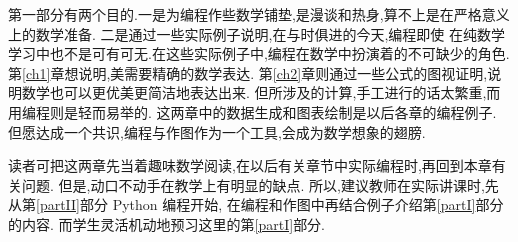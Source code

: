 \documentclass[main.tex]{subfiles}
\begin{document}
第一部分有两个目的.一是为编程作些数学铺垫,是漫谈和热身,算不上是在严格意义上的数学准备.
二是通过一些实际例子说明,在与时俱进的今天,编程即使
在纯数学学习中也不是可有可无.在这些实际例子中,编程在数学中扮演着的不可缺少的角色.
第\ref{ch1}章想说明,美需要精确的数学表达.
第\ref{ch2}章则通过一些公式的图视证明,说明数学也可以更优美更简洁地表达出来.
但所涉及的计算,手工进行的话太繁重,而用编程则是轻而易举的.
这两章中的数据生成和图表绘制是以后各章的编程例子.
但愿达成一个共识,编程与作图作为一个工具,会成为数学想象的翅膀.

读者可把这两章先当着趣味数学阅读,在以后有关章节中实际编程时,再回到本章有关问题.
但是,动口不动手在教学上有明显的缺点.
所以,建议教师在实际讲课时,先从第\ref{partII}部分 Python 编程开始,
在编程和作图中再结合例子介绍第\ref{partI}部分的内容.
而学生灵活机动地预习这里的第\ref{partI}部分.
\end{document}
